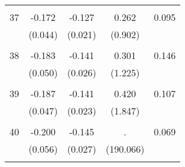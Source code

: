 \begin{tabular}{l*{1}{cccc}}
 & & & &\\
  37       & -0.172 & -0.127 & 0.262 & 0.095 \\
          & (0.044) & (0.021) & (0.902) & \\
 & & & &\\
  38       & -0.183 & -0.141 & 0.301 & 0.146 \\
          & (0.050) & (0.026) & (1.225) & \\
 & & & &\\
  39       & -0.187 & -0.141 & 0.420 & 0.107 \\
          & (0.047) & (0.023) & (1.847) & \\
 & & & &\\
  40       & -0.200 & -0.145 &     . & 0.069 \\
          & (0.056) & (0.027) & (190.066) & \\
 & & & &\\
\hline\hline
\end{tabular}
